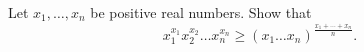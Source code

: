 Let $x_1, \ldots, x_n$ be positive real numbers. Show that
\[
x_1^{x_1}x_2^{x_2}\ldots x_n^{x_n} \geq (x_1\ldots x_n)^{\frac{x_1+\cdots+x_n}{n}}.
\]
